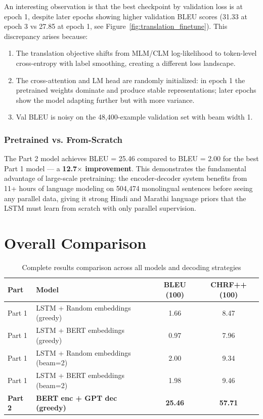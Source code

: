 \documentclass[12pt,a4paper]{article}
\begin{document}
An interesting observation is that the best checkpoint by validation loss is at epoch 1, despite later epochs showing higher validation BLEU scores (31.33 at epoch 3 vs 27.85 at epoch 1, see Figure~\ref{fig:translation_finetune}). This discrepancy arises because:
\begin{enumerate}
    \item The translation objective shifts from MLM/CLM log-likelihood to token-level cross-entropy with label smoothing, creating a different loss landscape.
    \item The cross-attention and LM head are randomly initialized: in epoch 1 the pretrained weights dominate and produce stable representations; later epochs show the model adapting further but with more variance.
    \item Val BLEU is noisy on the 48,400-example validation set with beam width 1.
\end{enumerate}

\subsubsection{Pretrained vs. From-Scratch}

The Part 2 model achieves BLEU = 25.46 compared to BLEU = 2.00 for the best Part 1 model — a \textbf{12.7$\times$ improvement}. This demonstrates the fundamental advantage of large-scale pretraining: the encoder-decoder system benefits from 11+ hours of language modeling on 504,474 monolingual sentences before seeing any parallel data, giving it strong Hindi and Marathi language priors that the LSTM must learn from scratch with only parallel supervision.

\section{Overall Comparison}

\begin{table}[H]
\centering\small
\caption{Complete results comparison across all models and decoding strategies}
\label{tab:overall}
\begin{tabular}{llcc}
\toprule
\textbf{Part} & \textbf{Model} & \textbf{BLEU (100)} & \textbf{CHRF++ (100)} \\
\midrule
Part 1 & LSTM + Random embeddings (greedy) & 1.66 & 8.47 \\
Part 1 & LSTM + BERT embeddings (greedy)   & 0.97 & 7.96 \\
Part 1 & LSTM + Random embeddings (beam=2) & 2.00 & 9.34 \\
Part 1 & LSTM + BERT embeddings (beam=2)   & 1.98 & 9.46 \\
\midrule
\textbf{Part 2} & \textbf{BERT enc + GPT dec (greedy)} & \textbf{25.46} & \textbf{57.71} \\
\bottomrule
\end{tabular}
\end{table}
\end{document}
